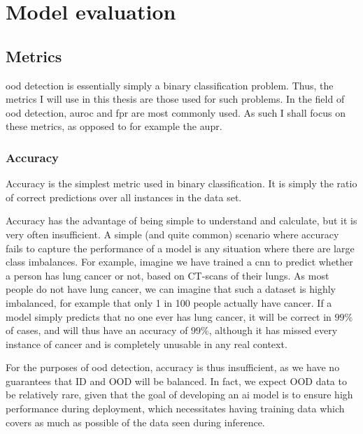 \documentclass[UKenglish]{uiomasterthesis} %
\theoremstyle{definition}
\begin{document}
\section{Model evaluation}

\subsection{Metrics}

\ac{ood} detection is essentially simply a binary classification problem. Thus, the metrics I will use in this thesis are those used for such problems. In the field of \ac{ood} detection, \ac{auroc} and \ac{fpr} are most commonly used. As such I shall focus on these metrics, as opposed to for example the \ac{aupr}.

\subsubsection{Accuracy}

Accuracy is the simplest metric used in binary classification. It is simply the ratio of correct predictions over all instances in the data set. %


Accuracy has the advantage of being simple to understand and calculate, but it is very often insufficient. A simple (and quite common) scenario where accuracy fails to capture the performance of a model is any situation where there are large class imbalances. For example, imagine we have trained a \ac{cnn} to predict whether a person has lung cancer or not, based on CT-scans of their lungs. As most people do not have lung cancer, we can imagine that such a dataset is highly imbalanced, for example that only 1 in 100 people actually have cancer. If a model simply predicts that no one ever has lung cancer, it will be correct in $99\%$ of cases, and will thus have an accuracy of $99\%$, although it has missed every instance of cancer and is completely unusable in any real context.

For the purposes of \ac{ood} detection, accuracy is thus insufficient, as we have no guarantees that ID and OOD will be balanced. In fact, we expect OOD data to be relatively rare, given that the goal of developing an \ac{ai} model is to ensure high performance during deployment, which necessitates having training data which covers as much as possible of the data seen during inference.
\end{document}
